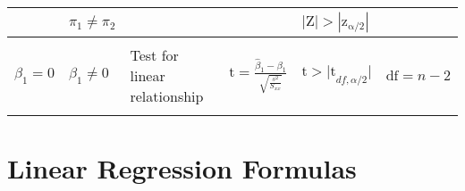 \documentclass[8pt]{extarticle}
\begin{document}
\begin{center}
\begin{tabular}{ | l | l | l | l | l | l | }
        & $\pi_1\ne\pi_2$
        &
        &
        & $\mathrm{|Z|}>\mathrm{|z_{\alpha/2}|}$
        & \\ \hline\hline

        &
        &
        &
        &
        & \\

        $\beta_1=0$
        & $\beta_1\ne0$
        & Test for linear relationship
        & $\mathrm{t}=\frac{\hat{\beta}_1-\beta_1}{\sqrt{\frac{s^2}{S_{xx}}}}$
        & $\mathrm{t}>\mathrm{|t}_{df,\alpha/2}|$
        & $\mathrm{df}={n-2}$ \\

        &
        &
        &
        &
        & \\ \hline

    \end{tabular}
\end{center}

\section{Linear Regression Formulas}
\end{document}
